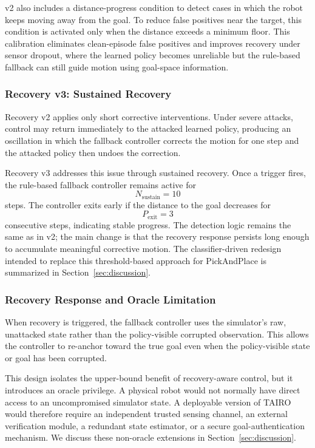 \documentclass[conference]{IEEEtran}
\begin{document}
v2 also includes a distance-progress condition to detect cases in which the robot keeps
moving away from the goal. To reduce false positives near the target, this condition is
activated only when the distance exceeds a minimum floor. This calibration eliminates
clean-episode false positives and improves recovery under sensor dropout, where the
learned policy becomes unreliable but the rule-based fallback can still guide motion
using goal-space information.

\subsubsection{Recovery v3: Sustained Recovery}

Recovery v2 applies only short corrective interventions. Under severe attacks, control
may return immediately to the attacked learned policy, producing an oscillation in which
the fallback controller corrects the motion for one step and the attacked policy then
undoes the correction.

Recovery v3 addresses this issue through sustained recovery. Once a trigger fires, the
rule-based fallback controller remains active for
\[
N_{\mathrm{sustain}} = 10
\]
steps. The controller exits early if the distance to the goal decreases for
\[
P_{\mathrm{exit}} = 3
\]
consecutive steps, indicating stable progress. The detection logic remains the same as
in v2; the main change is that the recovery response persists long enough to accumulate
meaningful corrective motion. The classifier-driven redesign intended to replace this
threshold-based approach for PickAndPlace is summarized in Section~\ref{sec:discussion}.

\subsubsection{Recovery Response and Oracle Limitation}

When recovery is triggered, the fallback controller uses the simulator's raw,
unattacked state rather than the policy-visible corrupted observation. This allows the
controller to re-anchor toward the true goal even when the policy-visible state or goal
has been corrupted.

This design isolates the upper-bound benefit of recovery-aware control, but it introduces
an oracle privilege. A physical robot would not normally have direct access to an
uncompromised simulator state. A deployable version of TAIRO would therefore require an
independent trusted sensing channel, an external verification module, a redundant state
estimator, or a secure goal-authentication mechanism. We discuss these non-oracle
extensions in Section~\ref{sec:discussion}.
\end{document}
